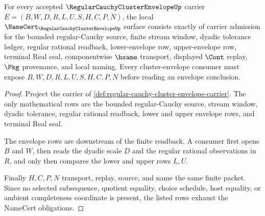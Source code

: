 \begin{theorem}
\label{thm:regular-cauchy-cluster-envelope-namecert-obligations}
For every accepted $\RegularCauchyClusterEnvelopeUp$ carrier $E=(B,W,D,R,L,U,S,H,C,P,N)$, the local $\NameCert_{\RegularCauchyClusterEnvelopeUp}$ surface consists exactly of carrier admission for the bounded regular-Cauchy source, finite stream window, dyadic tolerance ledger, regular rational readback, lower-envelope row, upper-envelope row, terminal Real seal, componentwise $\hsame$ transport, displayed $\Cont$ replay, $\Pkg$ provenance, and local naming. Every cluster-envelope consumer must expose $B,W,D,R,L,U,S,H,C,P,N$ before reading an envelope conclusion.
\end{theorem}
\begin{proof}
Project the carrier of \autoref{def:regular-cauchy-cluster-envelope-carrier}. The only mathematical rows are the bounded regular-Cauchy source, stream window, dyadic tolerance, regular rational readback, lower and upper envelope rows, and terminal Real seal.

The envelope rows are downstream of the finite readback. A consumer first opens $B$ and $W$, then reads the dyadic scale $D$ and the regular rational observations in $R$, and only then compares the lower and upper rows $L,U$.

Finally $H,C,P,N$ transport, replay, source, and name the same finite packet. Since no selected subsequence, quotient equality, choice schedule, host equality, or ambient completeness coordinate is present, the listed rows exhaust the NameCert obligations.
\end{proof}

